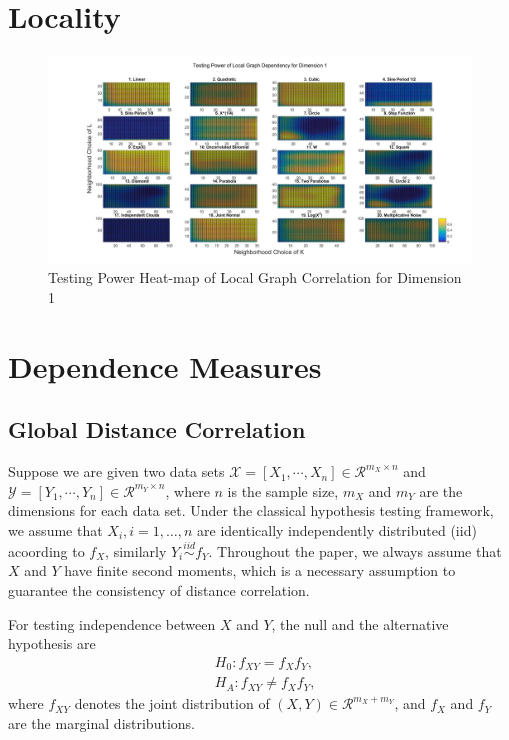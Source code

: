 \documentclass[11pt]{article}
\begin{document}
\section{Locality}
\begin{figure}[htbp]
\includegraphics[width=1.0\textwidth]{../Figures/Fig2s}
\caption{Testing Power Heat-map of Local Graph Correlation for Dimension 1}
\label{figSim2}
\end{figure}



\section{Dependence Measures}
\label{main}
\subsection{Global Distance Correlation}
\label{main1}
Suppose we are given two data sets $\mathcal{X}=[X_{1},\cdots, X_{n}] \in \mathcal{R}^{m_{X} \times n}$ and $\mathcal{Y}=[Y_{1},\cdots, Y_{n}] \in \mathcal{R}^{m_{Y} \times n}$, where $n$ is the sample size, $m_{X}$ and $m_{Y}$ are the dimensions for each data set. Under the classical hypothesis testing framework, we assume that $X_{i}, i=1,\ldots,n$ are identically independently distributed (iid) acoording to $f_X$, similarly $Y_{i} \stackrel{iid}{\sim} f_Y$. Throughout the paper, we always assume that $X$ and $Y$ have finite second moments, which is a necessary assumption to guarantee the consistency of distance correlation.

For testing independence between $X$ and $Y$, the null and the alternative hypothesis are
\begin{align*}
& H_{0}: f_{XY}=f_{X}f_{Y},\\
& H_{A}: f_{XY} \neq f_{X}f_{Y},
\end{align*}
where $f_{XY}$ denotes the joint distribution of $(X,Y) \in \mathcal{R}^{m_{X}+m_{Y}}$, and $f_{X}$ and $f_{Y}$ are the marginal distributions. 
\end{document}
